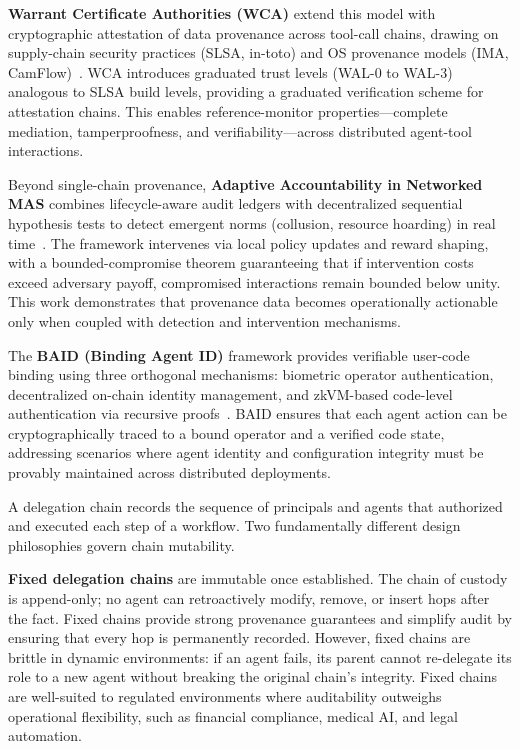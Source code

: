 \textbf{Warrant Certificate Authorities (WCA)} extend this model with cryptographic attestation of data provenance across tool-call chains, drawing on supply-chain security practices (SLSA, in-toto) and OS provenance models (IMA, CamFlow)~\cite{IETF:draft-bondar-wca-00}. WCA introduces graduated trust levels (WAL-0 to WAL-3) analogous to SLSA build levels, providing a graduated verification scheme for attestation chains. This enables reference-monitor properties---complete mediation, tamperproofness, and verifiability---across distributed agent-tool interactions.

Beyond single-chain provenance, \textbf{Adaptive Accountability in Networked MAS} combines lifecycle-aware audit ledgers with decentralized sequential hypothesis tests to detect emergent norms (collusion, resource hoarding) in real time~\cite{arxiv:2512.18561}. The framework intervenes via local policy updates and reward shaping, with a bounded-compromise theorem guaranteeing that if intervention costs exceed adversary payoff, compromised interactions remain bounded below unity. This work demonstrates that provenance data becomes operationally actionable only when coupled with detection and intervention mechanisms.

The \textbf{BAID (Binding Agent ID)} framework provides verifiable user-code binding using three orthogonal mechanisms: biometric operator authentication, decentralized on-chain identity management, and zkVM-based code-level authentication via recursive proofs~\cite{arxiv:2512.17538}. BAID ensures that each agent action can be cryptographically traced to a bound operator and a verified code state, addressing scenarios where agent identity and configuration integrity must be provably maintained across distributed deployments.


A delegation chain records the sequence of principals and agents that authorized and executed each step of a workflow. Two fundamentally different design philosophies govern chain mutability.

\textbf{Fixed delegation chains} are immutable once established. The chain of custody is append-only; no agent can retroactively modify, remove, or insert hops after the fact. Fixed chains provide strong provenance guarantees and simplify audit by ensuring that every hop is permanently recorded. However, fixed chains are brittle in dynamic environments: if an agent fails, its parent cannot re-delegate its role to a new agent without breaking the original chain's integrity. Fixed chains are well-suited to regulated environments where auditability outweighs operational flexibility, such as financial compliance, medical AI, and legal automation.

